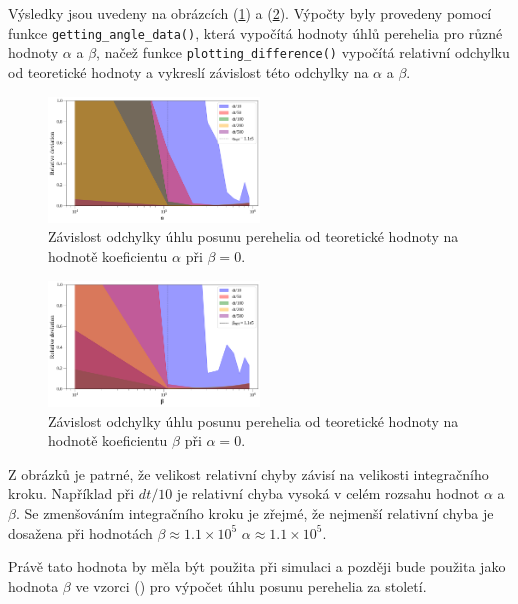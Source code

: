 \documentclass[a4paper,11pt,twocolumn]{article}
\begin{document}
            Výsledky jsou uvedeny na obrázcích (\ref{fig:phi_alpha_diff}) a (\ref{fig:phi_beta_diff}). Výpočty byly provedeny pomocí funkce \texttt{getting\_angle\_data()}, která vypočítá hodnoty úhlů perehelia pro různé hodnoty $\alpha$ a $\beta$, načež funkce \texttt{plotting\_difference()} vypočítá relativní odchylku od teoretické hodnoty a vykreslí závislost této odchylky na $\alpha$ a $\beta$. 

            \begin{figure}
                \centering
                \includegraphics[width=0.5\textwidth]{phi_alpha_diff.png}
                \caption{Závislost odchylky úhlu posunu perehelia od teoretické hodnoty na hodnotě koeficientu $\alpha$ při $\beta = 0$.}
                \label{fig:phi_alpha_diff}
            \end{figure}

            \begin{figure}
                \centering
                \includegraphics[width=0.5\textwidth]{phi_beta_diff.png}
                \caption{Závislost odchylky úhlu posunu perehelia od teoretické hodnoty na hodnotě koeficientu $\beta$ při $\alpha = 0$.}
                \label{fig:phi_beta_diff}
            \end{figure}

            Z obrázků je patrné, že velikost relativní chyby závisí na velikosti integračního kroku. Například při $dt/10$ je relativní chyba vysoká v celém rozsahu hodnot $\alpha$ a $\beta$. Se zmenšováním integračního kroku je zřejmé, že nejmenší relativní chyba je dosažena při hodnotách $\beta \approx 1.1 \times 10^5$  $\alpha \approx 1.1 \times 10^5$. 

            Právě tato hodnota by měla být použita při simulaci a později bude použita jako hodnota $\beta$ ve vzorci () pro výpočet úhlu posunu perehelia za století.
\end{document}

